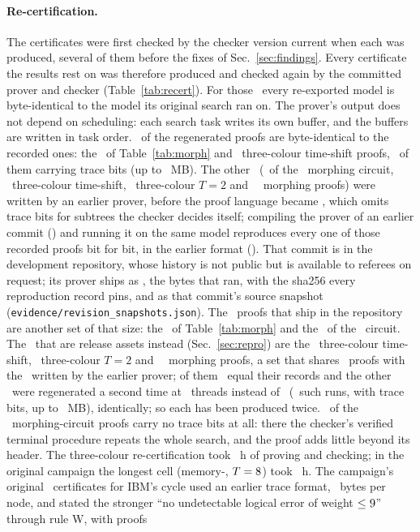 \documentclass[aps,pra,twocolumn,superscriptaddress,nofootinbib,longbibliography,floatfix]{revtex4-2}
\begin{document}
\paragraph*{Re-certification.} The certificates were first checked by the checker version current when each was produced, several of them before the fixes of Sec.~\ref{sec:findings}. Every certificate the results rest on was therefore produced and checked again by the committed prover and checker (Table~\ref{tab:recert}). For those \RecertCells\ every re-exported model is byte-identical to the model its original search ran on. The prover's output does not depend on scheduling: each search task writes its own buffer, and the buffers are written in task order. \RecertProofEqual\ of the regenerated proofs are byte-identical to the recorded ones: the \RecertEqTwentySix\ of Table~\ref{tab:morph} and \RecertEqTc\ three-colour time-shift proofs, \RecertProofEqualBits\ of them carrying trace bits (up to \RecertProofEqualMaxMB~MB). The other \RecertProofFormat\ (\RecertDiffSmall\ of the \SmallCode\ morphing circuit, \RecertDiffTc\ three-colour time-shift, \RecertDiffTcTwo\ three-colour $T=2$ and \RecertDiffBig\ \GrossCode\ morphing proofs) were written by an earlier prover, before the proof language became \CdpFiveName, which omits trace bits for subtrees the checker decides itself; compiling the prover of an earlier commit (\RecertOldCommits) and running it on the same model reproduces every one of those recorded proofs bit for bit, in the earlier format (\RecertOldMagic). That commit is in the development repository, whose history is not public but is available to referees on request; its prover ships as \RecertOldSource, the bytes that ran, with the sha256 every reproduction record pins, and as that commit's source snapshot (\nolinkurl{evidence/revision_snapshots.json}). The \RecertShipped\ proofs that ship in the repository are another set of that size: the \RecertEqTwentySix\ of Table~\ref{tab:morph} and the \RecertDiffSmall\ of the \SmallCode\ circuit. The \RecertRegen\ that are release assets instead (Sec.~\ref{sec:repro}) are the \RecertRegenTc\ three-colour time-shift, \RecertDiffTcTwo\ three-colour $T=2$ and \RecertDiffBig\ \GrossCode\ morphing proofs, a set that shares \RecertOverlap\ proofs with the \RecertProofFormat\ written by the earlier prover; of them \RecertTwiceByRecord\ equal their records and the other \RecertTwiceByRerun\ were regenerated a second time at \RecertDetThreads\ threads instead of \RecertCampaignThreads\ (\RecertDetCells\ such runs, with trace bits, up to \RecertDetMaxMB~MB), identically; so each has been produced twice. \RecertMorphZeroBits\ of the \RecertMorphCells\ morphing-circuit proofs carry no trace bits at all: there the checker's verified terminal procedure repeats the whole search, and the proof adds little beyond its header. The three-colour re-certification took \RecertTcHours~h of proving and checking; in the original campaign the longest cell (memory-\TcLongestB, $T=8$) took \TcLongestH~h. The campaign's original \IbmCerts\ certificates for IBM's cycle used an earlier trace format, \IbmBytesPerEntry\ bytes per node, and stated the stronger ``no undetectable logical error of weight $\le9$'' through rule W, with proofs 
\end{document}
